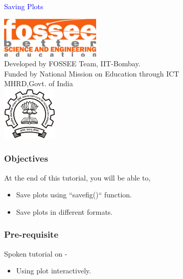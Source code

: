 \documentclass[presentation]{beamer}
\title{}
\author{FOSSEE}
\date{2010-10-11 Mon}
\begin{document}
\begin{frame}

\begin{center}
\vspace{12pt}
\textcolor{blue}{\huge Saving Plots}
\end{center}
\vspace{18pt}
\begin{center}
\vspace{10pt}
\includegraphics[scale=0.95]{../images/fossee-logo.png}\\
\vspace{5pt}
\scriptsize Developed by FOSSEE Team, IIT-Bombay. \\ 
\scriptsize Funded by National Mission on Education through ICT\\
\scriptsize  MHRD,Govt. of India\\
\includegraphics[scale=0.30]{../images/iitb-logo.png}\\
\end{center}
\end{frame}
\begin{frame}
\frametitle{Objectives}
\label{sec-2}

  At the end of this tutorial, you will be able to,

\begin{itemize}
\item Save plots using ``savefig()`` function.
\item Save plots in different formats.
\end{itemize}
  
\end{frame}
\begin{frame}
\frametitle{Pre-requisite}
\label{sec-3}

  Spoken tutorial on -

\begin{itemize}
\item Using plot interactively.
\end{itemize}
\end{frame}
\end{document}
